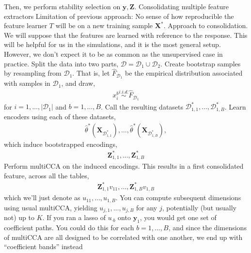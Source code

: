 \documentclass[11pt]{article}
\begin{document}
\begin{outline}
      \4 Then, we perform stability selection on $\mathbf{y}, \mathbf{Z}$.
  \2 Consolidating multiple feature extractors
    \3 Limitation of previous approach: No sense of how reproducible the feature
    learner $T$ will be on a new training sample $\mathbf{X}^{\ast}$.
    \3 Approach to consolidation. We will suppose that the features are learned
    with reference to the response. This will be helpful for us in the
    simulations, and it is the most general setup. However, we don't expect it
    to be as common as the unsupervised case in practice.
      \4 Split the data into two parts, $\mathcal{D} = \mathcal{D}_{1} \cup \mathcal{D}_{2}$.
      \4 Create bootstrap samples by resampling from $\mathcal{D}_{1}$. That is,
      let $\hat{F}_{\mathcal{D}_{1}}$ be the empirical distribution associated
      with samples in $\mathcal{D}_{1}$, and draw,
      \begin{align}
        x_{i}^{b} \overset{i.i.d.}{\sim} \hat{F}_{\mathcal{D}_{1}}
      \end{align}
      for $i = 1, \dots, \left|\mathcal{D}_{1}\right|$ and $b = 1, \dots, B$.
      Call the resulting datasets $\mathcal{D}_{1,1}^{\ast}, \dots,
      \mathcal{D}_{1, B}^{\ast}$.
      \4 Learn encoders using each of these datasets,
      \begin{align}
        \hat{\theta}^{\ast}\left(\mathbf{X}_{\mathcal{D}_{1,1}^{\ast}}\right), \dots, \hat{\theta}^{\ast}\left(\mathbf{X}_{\mathcal{D}_{1,B}^{\ast}}\right),
      \end{align}
      which induce bootstrapped encodings,
      \begin{align}
        \mathbf{Z}_{1,1}^{\ast}, \dots, \mathbf{Z}_{1,B}^{\ast}
      \end{align}
      \4 Perform multiCCA on the induced encodings. This results in a first
      consolidated feature, across all the tables,
      \begin{align}
        \mathbf{Z}_{1,1}^{\ast}v_{11}, \dots, \mathbf{Z}_{1, B}^{\ast}v_{1,B}
      \end{align}
      which we'll just denote as $u_{11}, \dots, u_{1,B}$. You can compute
      subsequent dimensions using usual multiCCA, yielding $u_{j,1}, \dots,
      u_{j,B}$ for any $j$, potentially (but usually not) up to $K$.
      \4 If you ran a lasso of $u_{\cdot b}$ onto $\mathbf{y}_{1}$, you would
      get one set of coefficient paths. You could do this for each $b = 1,
      \dots, B$, and since the dimensions of multiCCA are all designed to be
      correlated with one another, we end up with ``coefficient bands'' instead

\end{outline}
\end{document}
